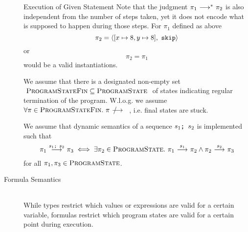 \begin{description}
\begin{example}{Execution of Given Statement}
        Note that the judgment ${\pi_1} \,\,{\longrightarrow^{*}}\,\, {\pi_2}$ is also independent from the number of steps taken, yet it does not encode what is supposed to happen during those steps.
        For $\pi_1$ defined as above
        \begin{displaymath}
        \pi_2 = \langle [x \mapsto 8, y \mapsto 8],\,\, \textup{\texttt{skip}} \rangle
        \end{displaymath}
        or
        \begin{displaymath}
        \pi_2 = \pi_1
        \end{displaymath}
        would be a valid instantiations.
    \end{example}
    
    We assume that there is a designated non-empty set $~\textup{\textsc{ProgramStateFin}} \subseteq \textup{\textsc{ProgramState}}~$ of states indicating regular termination of the program.
    W.l.o.g. we assume $\forall \pi \in \setProgramStateFin.~ \sstepStuck{\pi}$, i.e. final states are stuck.
    
    We assume that dynamic semantics of a sequence $\textup{\texttt{{$s_1$};~{$s_2$}}}$ is implemented such that 
    \begin{align}
    \label{frm:assume-seq-ss}
    \sstepConsume{\sSeq{$s_1$}{$s_2$}}{\pi_1}{\pi_3} \iff \exists \pi_2 \in \setProgramState.~ \sstepConsume{s_1}{\pi_1}{\pi_2} \wedge \sstepConsume{s_2}{\pi_2}{\pi_3}
    \end{align}
    for all $\pi_1, \pi_3 \in \textup{\textsc{ProgramState}}$.
    
    
    \begin{comment}
    Optionally, there may be a subset $~\setProgramStateEx \subseteq \setProgramStateFin~$ of states indicating exceptional termination of the program.
    To simplify reasoning about exceptional states, we assume $$\forall \pi_X \in \setProgramStateEx, \phi \in \setFormula.~ \evalphiGen{\pi_X}{\phi}$$ and something with special statement set?
    
    
    \end{comment}
    
\item[Formula Semantics]~\\
    While types restrict which values or expressions are valid for a certain variable,
    formulas restrict which program states are valid for a certain point during execution. 


\end{description}
